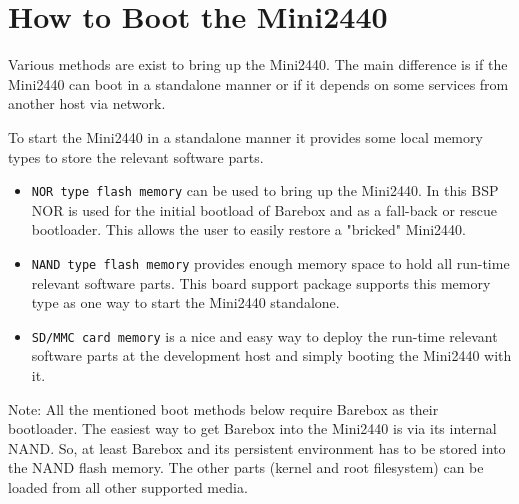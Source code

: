 %
%
%
%
%
%
%

\chapter{How to Boot the Mini2440}	\label{sec:bootingmini2440}

Various methods are exist to bring up the Mini2440. The main difference is if
the Mini2440 can boot in a standalone manner or if it depends on some services
from another host via network.

To start the Mini2440 in a standalone manner it provides some local memory types
to store the relevant software parts.

\begin{itemize}
\item \texttt{NOR type flash memory} can be used to bring up the Mini2440. In
	this BSP NOR is used for the initial bootload of Barebox and as a
	fall-back or rescue bootloader. This allows the user to easily restore
	a "bricked" Mini2440.
\item \texttt{NAND type flash memory} provides enough memory space to hold all
	run-time relevant software parts. This board support package supports
	this memory type as one way to start the Mini2440 standalone.
\item \texttt{SD/MMC card memory} is a nice and easy way to deploy the run-time
	relevant software parts at the development host and simply booting
	the Mini2440 with it.
\end{itemize}

Note: All the mentioned boot methods below require Barebox as their bootloader.
The easiest way to get Barebox into the Mini2440 is via its internal NAND. So,
at least Barebox and its persistent environment has to be stored into the NAND
flash memory. The other parts (kernel and root filesystem) can be loaded from
all other supported media.

